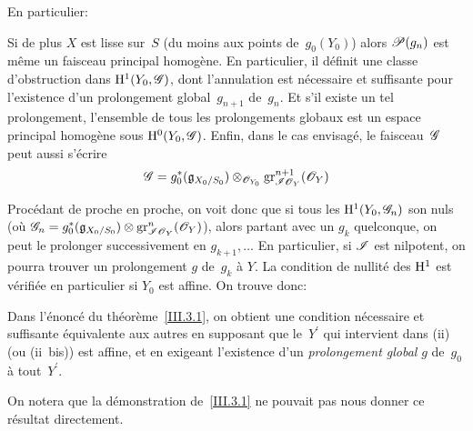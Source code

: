 En particulier:

\begin{corollaire}
\label{III.5.4}
Si de plus $X$ est lisse sur~$S$ (du moins aux points de~$g_0(Y_0)$)
alors
$\cal{P}(g_{n})$
est m\^eme un faisceau principal homog\`ene.
\enlargethispage{.5cm}En particulier, il d\'efinit une classe d'obstruction dans
$\H^1(Y_0,\cal{G})$, dont l'annulation est n\'ecessaire et
suffisante pour l'existence d'un prolongement global~$g_{n+1}$
de~$g_n$. Et s'il existe un tel prolongement, l'ensemble de tous les
prolongements globaux est un espace principal homog\`ene sous
$\H^0(Y_0,\cal{G})$. Enfin, dans le cas envisag\'e, le
faisceau~$\cal{G}$ peut aussi s'\'ecrire
\begin{equation*}
\cal{G}=g_0^*(\goth{g}_{X_0/S_0})\otimes_{\cal{O}_{Y_0}}
\gr_{\cal{IO}_Y}^{n+1}(\cal{O}_Y)
\end{equation*}
\end{corollaire}

Proc\'edant de proche en proche, on voit donc que si tous les
$\H^1(Y_0,\cal{G}_n)$ son nuls (o\`u
$\cal{G}_n=g_0^*(\goth{g}_{X_0/S_0})\otimes
\gr_{\cal{IO}_Y}^{n}(\cal{O}_Y)$), alors partant avec un $g_k$
quelconque, on peut le prolonger successivement en $g_{k+1},\dots$ En
particulier, si $\cal{I}$ est nilpotent, on pourra trouver un
prolongement $g$ de~$g_k$ \`a $Y$. La condition de nullit\'e des
$\mathrm{H}^1$ est v\'erifi\'ee en particulier si $Y_0$ est affine. On
trouve donc:

\begin{corollaire}
\label{III.5.5}
Dans
l'\'enonc\'e du th\'eor\`eme~\ref{III.3.1}, on obtient
une condition n\'ecessaire et suffisante \'equivalente aux autres
en supposant que le~$Y^\prime$ qui intervient dans \textup{(ii)} (ou \textup{(ii~bis)})
est affine, et en exigeant l'existence d'un \emph{prolongement global}
$g$ de~$g_0$ \`a tout~$Y^\prime$.
\end{corollaire}

On notera que la d\'emonstration de~\ref{III.3.1} ne pouvait pas
nous donner ce r\'esultat directement.

